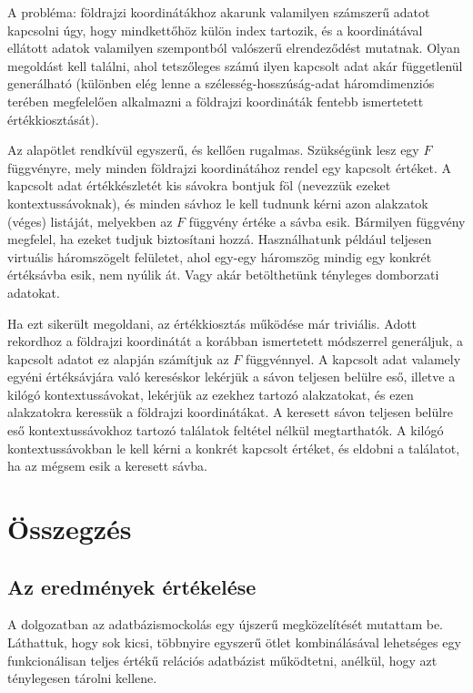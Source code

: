 \documentclass[
    parspace,
    noindent,
    nohyp,
]{elteiktdk}[2023/04/10]
\begin{document}
A probléma: földrajzi koordinátákhoz akarunk valamilyen számszerű adatot kapcsolni úgy,
hogy mindkettőhöz külön index tartozik,
és a koordinátával ellátott adatok valamilyen szempontból valószerű elrendeződést mutatnak.
Olyan megoldást kell találni, ahol tetszőleges számú ilyen kapcsolt adat akár függetlenül generálható
(különben elég lenne a szélesség-hosszúság-adat háromdimenziós terében megfelelően alkalmazni
a földrajzi koordináták fentebb ismertetett értékkiosztását).

Az alapötlet rendkívül egyszerű, és kellően rugalmas.
Szükségünk lesz egy $F$ függvényre, mely minden földrajzi koordinátához rendel egy kapcsolt értéket.
A kapcsolt adat értékkészletét kis sávokra bontjuk föl (nevezzük ezeket kontextussávoknak),
és minden sávhoz le kell tudnunk kérni azon alakzatok (véges) listáját,
melyekben az $F$ függvény értéke a sávba esik.
Bármilyen függvény megfelel, ha ezeket tudjuk biztosítani hozzá.
Használhatunk például teljesen virtuális háromszögelt felületet,
ahol egy-egy háromszög mindig egy konkrét értéksávba esik, nem nyúlik át.
Vagy akár betölthetünk tényleges domborzati adatokat.

Ha ezt sikerült megoldani, az értékkiosztás működése már triviális.
Adott rekordhoz a földrajzi koordinátát a korábban ismertetett módszerrel generáljuk,
a kapcsolt adatot ez alapján számítjuk az $F$ függvénnyel.
A kapcsolt adat valamely egyéni értéksávjára való kereséskor
lekérjük a sávon teljesen belülre eső, illetve a kilógó kontextussávokat,
lekérjük az ezekhez tartozó alakzatokat,
és ezen alakzatokra keressük a földrajzi koordinátákat.
A keresett sávon teljesen belülre eső kontextussávokhoz tartozó találatok feltétel nélkül megtarthatók.
A kilógó kontextussávokban le kell kérni a konkrét kapcsolt értéket,
és eldobni a találatot, ha az mégsem esik a keresett sávba.





\chapter{Összegzés}

\section{Az eredmények értékelése}

A dolgozatban az adatbázismockolás egy újszerű megközelítését mutattam be.
Láthattuk, hogy sok kicsi, többnyire egyszerű ötlet kombinálásával lehetséges
egy funkcionálisan teljes értékű relációs adatbázist működtetni,
anélkül, hogy azt ténylegesen tárolni kellene.
\end{document}
